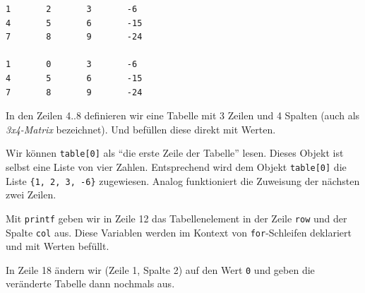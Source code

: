 \begin{cmdbox}
\begin{verbatim}
1       2       3       -6
4       5       6       -15
7       8       9       -24

1       0       3       -6
4       5       6       -15
7       8       9       -24
\end{verbatim}
\end{cmdbox}

In den Zeilen 4..8 definieren wir eine Tabelle mit 3 Zeilen und 4 Spalten (auch als \emph{3x4-Matrix} bezeichnet). Und befüllen diese direkt mit Werten.

Wir können \texttt{table[0]} als \enquote{die erste Zeile der Tabelle} lesen. Dieses Objekt ist selbst eine Liste von vier Zahlen. Entsprechend wird dem Objekt \texttt{table[0]} die Liste \texttt{\{1, 2, 3, -6\}} zugewiesen. Analog funktioniert die Zuweisung der nächsten zwei Zeilen.

Mit \texttt{printf} geben wir in Zeile 12 das Tabellenelement in der Zeile \texttt{row} und der Spalte \texttt{col} aus. Diese Variablen werden im Kontext von \texttt{for}-Schleifen deklariert und mit Werten befüllt.

In Zeile 18 ändern wir (Zeile 1, Spalte 2) auf den Wert \texttt{0} und geben die veränderte Tabelle dann nochmals aus.


